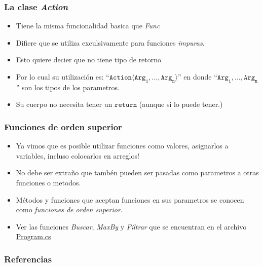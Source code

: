 \documentclass{beamer}
\begin{document}
\begin{frame}
    \frametitle{La clase \emph{Action}}
    \begin{itemize}
        \item{Tiene la misma funcionalidad basica que \emph{Func}}
        \item{Difiere que se utiliza exculsivamente para funciones \emph{impuras}.}
        \item{Esto quiere decier que no tiene tipo de retorno}
        \item{Por lo cual su utilizaci\'on es: ``$\mathtt{Action}\langle\mathtt{Arg_1},\ldots,\mathtt{Arg_n}\rangle$''
        en donde ``$\mathtt{Arg_1},\ldots,\mathtt{Arg_n}$'' son los tipos de los parametros.}
        \item{Su cuerpo no necesita tener un $\mathtt{return}$ (aunque si lo puede tener.)}
    \end{itemize}
\end{frame}

\begin{frame}
    \frametitle{Funciones de orden superior}
    \begin{itemize}
        \item{Ya vimos que es posible utilizar funciones como valores,
        asignarlos a variables, incluso colocarlos en arreglos!}
        \item{No debe ser extra\~no que tamb\'en pueden ser pasadas como
        parametros a otras funciones o metodos.}
        \item{M\'etodos y funciones que aceptan funciones en sus parametros
        se conocen como \emph{funciones de orden superior}}.
        \item{Ver las funciones \emph{Buscar}, \emph{MaxBy} y \emph{Filtrar}
        que se encuentran en el archivo \href{run:../Ejemplos/Lambdas/Program.cs}{Program.cs}}
    \end{itemize}
\end{frame}

\begin{frame}
    \frametitle{Referencias}
    
    
\end{frame}
\end{document}
